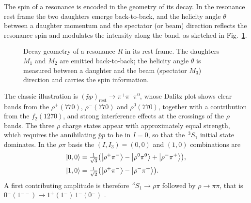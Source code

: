 The spin of a resonance is encoded in the geometry of its decay. In the resonance
rest frame the two daughters emerge back-to-back, and the helicity angle $\theta$
between a daughter momentum and the spectator (or beam) direction reflects the
resonance spin and modulates the intensity along the band, as sketched in
Fig.~\ref{fig:dalitz_geometry}.

\begin{figure}[htbp]
  \centering
  \caption{Decay geometry of a resonance $R$ in its rest frame. The daughters
           $M_1$ and $M_2$ are emitted back-to-back; the helicity angle $\theta$ is
           measured between a daughter and the beam (spectator $M_3$) direction and
           carries the spin information.}
  \label{fig:dalitz_geometry}
\end{figure}

The classic illustration is $(\bar p p)_{\text{rest}}\to\pi^+\pi^-\pi^0$, whose
Dalitz plot shows clear bands from the $\rho^+(770)$, $\rho^-(770)$ and
$\rho^0(770)$, together with a contribution from the $f_2(1270)$, and strong
interference effects at the crossings of the $\rho$ bands. The three $\rho$ charge
states appear with approximately equal strength, which requires the annihilating
$\bar p p$ to be in $I=0$, so that the $\,^3S_1$ initial state dominates. In the
$\rho\pi$ basis the $(I,I_3)=(0,0)$ and $(1,0)$ combinations are
\begin{align}
  \ket{0,0} &= \tfrac{1}{\sqrt{3}}
      \bigl(\ket{\rho^+\pi^-} - \ket{\rho^0\pi^0} + \ket{\rho^-\pi^+}\bigr),
      \label{eq:rhopi_I0}\\[2pt]
  \ket{1,0} &= \tfrac{1}{\sqrt{2}}
      \bigl(\ket{\rho^+\pi^-} - \ket{\rho^-\pi^+}\bigr).
      \label{eq:rhopi_I1}
\end{align}
A first contributing amplitude is therefore $\,^3S_1\to\rho\pi$ followed by
$\rho\to\pi\pi$, that is $0^{-}(1^{--})\to 1^{+}(1^{-})\,1^{-}(0^{-})$
\cite[Ch.~11]{Amsler2018}.


